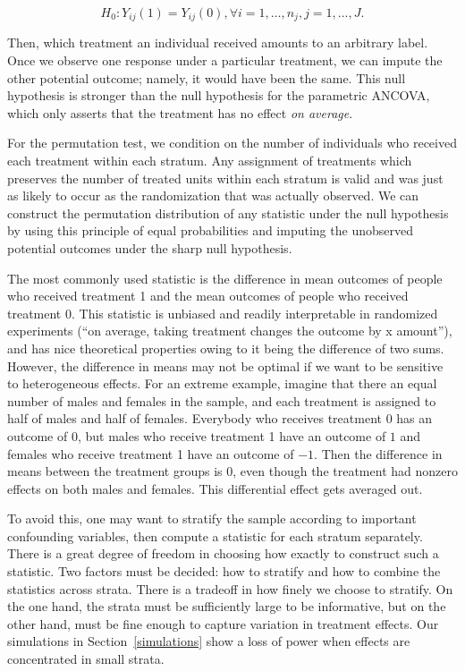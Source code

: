 \documentclass[12pt]{article}
\begin{document}
$$H_0: Y_{ij}(1) = Y_{ij}(0), \forall i = 1, \dots, n_j, j = 1,\dots, J.$$

Then, which treatment an individual received amounts to an arbitrary label.
Once we observe one response under a particular treatment, we can impute the other potential outcome; namely, it would have been the same.
This null hypothesis is stronger than the null hypothesis for the parametric ANCOVA, which only asserts that the treatment has no effect \textit{on average}.

For the permutation test, we condition on the number of individuals who received each treatment within each stratum.
Any assignment of treatments which preserves the number of treated units within each stratum is valid and was just as likely to occur as the randomization that was actually observed.
We can construct the permutation distribution of any statistic under the null hypothesis by using this principle of equal probabilities and imputing the unobserved potential outcomes under the sharp null hypothesis.

The most commonly used statistic is the difference in mean outcomes of people who received treatment 1 and the mean outcomes of people who received treatment 0.  
This statistic is unbiased and readily interpretable in randomized experiments (``on average, taking treatment changes the outcome by x amount''), and has nice theoretical properties owing to it being the difference of two sums.
However, the difference in means may not be optimal if we want to be sensitive to heterogeneous effects.  
For an extreme example, imagine that there an equal number of males and females in the sample, and each treatment is assigned to half of males and half of females.  
Everybody who receives treatment 0 has an outcome of 0, but males who receive treatment 1 have an outcome of $1$ and females who receive treatment 1 have an outcome of $-1$.  
Then the difference in means between the treatment groups is $0$, even though the treatment had nonzero effects on both males and females.  
This differential effect gets averaged out.

To avoid this, one may want to stratify the sample according to important confounding variables, then compute a statistic for each stratum separately. 
There is a great degree of freedom in choosing how exactly to construct such a statistic.
Two factors must be decided: how to stratify and how to combine the statistics across strata.
There is a tradeoff in how finely we choose to stratify.
On the one hand, the strata must be sufficiently large to be informative,
 but on the other hand, must be fine enough to capture variation in treatment effects.
Our simulations in Section~\ref{simulations} show a loss of power when effects are concentrated in small strata.
\end{document}
